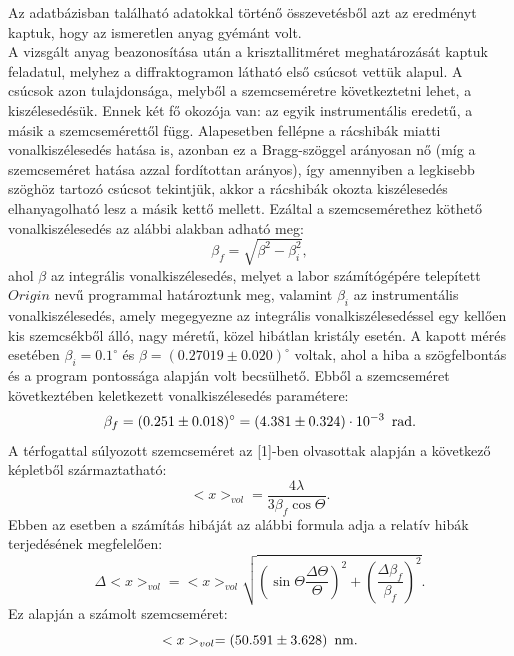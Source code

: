 \documentclass[12pt,a4paper]{article}
\begin{document}
\newline
Az adatbázisban található adatokkal történő összevetésből azt az eredményt kaptuk, hogy az ismeretlen anyag gyémánt volt.\\
\hspace*{10pt} A vizsgált anyag beazonosítása után a krisztallitméret meghatározását kaptuk feladatul, melyhez a diffraktogramon látható első csúcsot vettük alapul. A csúcsok azon tulajdonsága, melyből a szemcseméretre következtetni lehet, a kiszélesedésük. Ennek két fő okozója van: az egyik instrumentális eredetű, a másik a szemcsemérettől függ. Alapesetben fellépne a rácshibák miatti vonalkiszélesedés hatása is, azonban ez a Bragg-szöggel arányosan nő (míg a szemcseméret hatása azzal fordítottan arányos), így amennyiben a legkisebb szöghöz tartozó csúcsot tekintjük, akkor a rácshibák okozta kiszélesedés elhanyagolható lesz a másik kettő mellett. Ezáltal a szemcsemérethez köthető vonalkiszélesedés az alábbi alakban adható meg:
$$\beta_f = \sqrt{\beta^2 -\beta_i ^2} ,$$
ahol $\beta$ az integrális vonalkiszélesedés, melyet a labor számítógépére telepített $Origin$ nevű programmal határoztunk meg, valamint $\beta_i$ az instrumentális vonalkiszélesedés, amely megegyezne az integrális vonalkiszélesedéssel egy kellően kis szemcsékből álló, nagy méretű, közel hibátlan kristály esetén. A kapott mérés esetében $\beta_i=0.1^{\circ}$ és $\beta=(0.27019 \pm 0.020) ^{\circ}$ voltak, ahol a hiba a szögfelbontás és a program pontossága alapján volt becsülhető. Ebből a szemcseméret következtében keletkezett vonalkiszélesedés paramétere:
$$\beta_f=(0.251 \pm 0.018)^{\circ}=(4.381 \pm 0.324)\cdot 10^{-3}\hspace*{5pt} \mathrm{rad}.$$
A térfogattal súlyozott szemcseméret az [1]-ben olvasottak alapján a következő képletből származtatható:
$$<x>_{vol}=\frac{4\lambda}{3\beta_f \cos\Theta}.$$
Ebben az esetben a számítás hibáját az alábbi formula adja a relatív hibák terjedésének megfelelően:
$$\Delta <x>_{vol}=<x>_{vol} \sqrt{\left(\sin\Theta   \frac{\Delta \Theta}{\Theta} \right)^2+\left(\frac{\Delta \beta_f}{\beta_f}\right)^2}.$$
Ez alapján a számolt szemcseméret:
$$<x>_{vol} = (50.591 \pm  3.628)\hspace*{5pt} \mathrm{nm} .$$
\newpage
\end{document}
